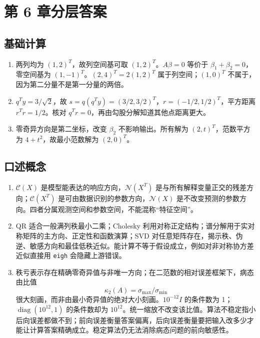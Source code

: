 \chapter{第 6 章分层答案}
\label{app:ch06-solutions}

\section*{基础计算}
\begin{enumerate}[leftmargin=*]
\item 两列均为 $(1,2)^T$，故列空间基可取 $(1,2)^T$。$A\beta=0$ 等价于 $\beta_1+\beta_2=0$，零空间基为 $(1,-1)^T$。$(2,4)^T=2(1,2)^T$ 属于列空间；$(1,0)^T$ 不属于，因为第二分量不是第一分量的两倍。
\item $q^Ty=3/\sqrt2$，故 $s=q(q^Ty)=(3/2,3/2)^T$，$r=(-1/2,1/2)^T$，平方距离 $r^Tr=1/2$。核对 $q^Tr=0$，再由勾股分解知道其他点距离更大。
\item 零奇异方向是第二坐标，改变 $\beta_2$ 不影响输出。所有解为 $(2,t)^T$，范数平方为 $4+t^2$，故最小范数解为 $(2,0)^T$。
\end{enumerate}

\section*{口述概念}
\begin{enumerate}[leftmargin=*]
  \item $\mathcal C(X)$ 是模型能表达的响应方向，$\mathcal N(X^T)$ 是与所有解释变量正交的残差方向；$\mathcal C(X^T)$ 是可由数据识别的参数方向，$\mathcal N(X)$ 是不改变预测的参数方向。四者分属观测空间和参数空间，不能混称“特征空间”。
  \item QR 适合一般满列秩最小二乘；Cholesky 利用对称正定结构；谱分解用于实对称矩阵的主方向、正定性和函数演算；SVD 对任意矩阵存在，揭示秩、伪逆、敏感方向和最佳低秩近似。能计算不等于假设成立，例如对非对称协方差近似直接用 \texttt{eigh} 会隐藏上游错误。
  \item 秩亏表示存在精确零奇异值与非唯一方向；在二范数的相对误差框架下，病态由比值
\[
\kappa_2(A)=\sigma_{\max}/\sigma_{\min}
\]
很大刻画，而非由最小奇异值的绝对大小刻画。$10^{-12}I$ 的条件数为 1；$\operatorname{diag}(10^{12},1)$ 的条件数却为 $10^{12}$。统一缩放不改变该比值。算法不稳定指小后向误差都做不到；前向误差衡量答案偏离，后向误差衡量要把输入改多少才能让计算答案精确成立。稳定算法仍无法消除病态问题的前向敏感性。
\end{enumerate}

